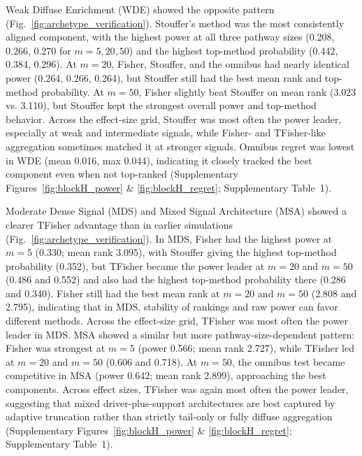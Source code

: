 \documentclass[unnumsec,webpdf,contemporary,large]{oup-authoring-template}%
\theoremstyle{thmstyleone}%
\theoremstyle{thmstyletwo}%
\theoremstyle{thmstylethree}%
\begin{document}
Weak Diffuse Enrichment (WDE) showed the opposite pattern (Fig.~\ref{fig:archetype_verification}). Stouffer's method was the most consistently aligned component, with the highest power at all three pathway sizes (0.208, 0.266, 0.270 for \(m=5,20,50\)) and the highest top-method probability (0.442, 0.384, 0.296). At \(m=20\), Fisher, Stouffer, and the omnibus had nearly identical power (0.264, 0.266, 0.264), but Stouffer still had the best mean rank and top-method probability. At \(m=50\), Fisher slightly beat Stouffer on mean rank (3.023 vs. 3.110), but Stouffer kept the strongest overall power and top-method behavior. Across the effect-size grid, Stouffer was most often the power leader, especially at weak and intermediate signals, while Fisher- and TFisher-like aggregation sometimes matched it at stronger signals. Omnibus regret was lowest in WDE (mean 0.016, max 0.044), indicating it closely tracked the best component even when not top-ranked (Supplementary Figures~\ref{fig:blockH_power} \& \ref{fig:blockH_regret}; Supplementary Table~1).

Moderate Dense Signal (MDS) and Mixed Signal Architecture (MSA) showed a clearer TFisher advantage than in earlier simulations (Fig.~\ref{fig:archetype_verification}). In MDS, Fisher had the highest power at \(m=5\) (0.330; mean rank 3.095), with Stouffer giving the highest top-method probability (0.352), but TFisher became the power leader at \(m=20\) and \(m=50\) (0.486 and 0.552) and also had the highest top-method probability there (0.286 and 0.340). Fisher still had the best mean rank at \(m=20\) and \(m=50\) (2.808 and 2.795), indicating that in MDS, stability of rankings and raw power can favor different methods. Across the effect-size grid, TFisher was most often the power leader in MDS. MSA showed a similar but more pathway-size-dependent pattern: Fisher was strongest at \(m=5\) (power 0.566; mean rank 2.727), while TFisher led at \(m=20\) and \(m=50\) (0.606 and 0.718). At \(m=50\), the omnibus test became competitive in MSA (power 0.642; mean rank 2.899), approaching the best components. Across effect sizes, TFisher was again most often the power leader, suggesting that mixed driver-plus-support architectures are best captured by adaptive truncation rather than strictly tail-only or fully diffuse aggregation (Supplementary Figures~\ref{fig:blockH_power} \& \ref{fig:blockH_regret}; Supplementary Table~1).
\end{document}
